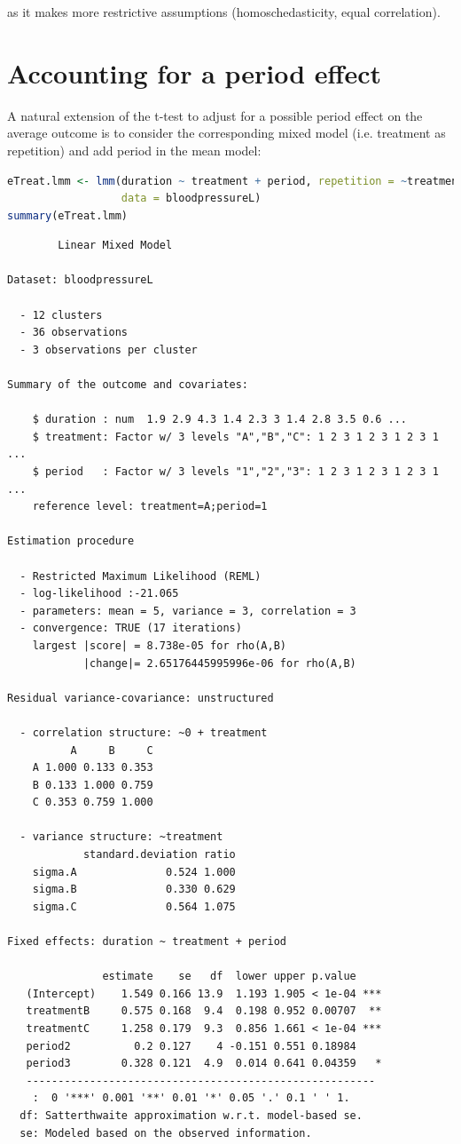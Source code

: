 \documentclass[12pt]{article}
\begin{document}
as it makes more restrictive assumptions (homoschedasticity, equal
correlation).

\clearpage
\section{Accounting for a period effect}
\label{sec:orgac4d037}

A natural extension of the t-test to adjust for a possible period
effect on the average outcome is to consider the corresponding mixed
model (i.e. treatment as repetition) and add period in the mean model:
\begin{lstlisting}[language=r,numbers=none]
eTreat.lmm <- lmm(duration ~ treatment + period, repetition = ~treatment|id,
                  data = bloodpressureL)
summary(eTreat.lmm)
\end{lstlisting}

\label{}
\begin{verbatim}
		Linear Mixed Model 
 
Dataset: bloodpressureL 

  - 12 clusters 
  - 36 observations 
  - 3 observations per cluster 

Summary of the outcome and covariates: 

    $ duration : num  1.9 2.9 4.3 1.4 2.3 3 1.4 2.8 3.5 0.6 ...
    $ treatment: Factor w/ 3 levels "A","B","C": 1 2 3 1 2 3 1 2 3 1 ...
    $ period   : Factor w/ 3 levels "1","2","3": 1 2 3 1 2 3 1 2 3 1 ...
    reference level: treatment=A;period=1 

Estimation procedure 

  - Restricted Maximum Likelihood (REML) 
  - log-likelihood :-21.065
  - parameters: mean = 5, variance = 3, correlation = 3
  - convergence: TRUE (17 iterations) 
    largest |score| = 8.738e-05 for rho(A,B)
            |change|= 2.65176445995996e-06 for rho(A,B)
 
Residual variance-covariance: unstructured 

  - correlation structure: ~0 + treatment 
          A     B     C
    A 1.000 0.133 0.353
    B 0.133 1.000 0.759
    C 0.353 0.759 1.000

  - variance structure: ~treatment 
            standard.deviation ratio
    sigma.A              0.524 1.000
    sigma.B              0.330 0.629
    sigma.C              0.564 1.075

Fixed effects: duration ~ treatment + period 

               estimate    se   df  lower upper p.value    
   (Intercept)    1.549 0.166 13.9  1.193 1.905 < 1e-04 ***
   treatmentB     0.575 0.168  9.4  0.198 0.952 0.00707  **
   treatmentC     1.258 0.179  9.3  0.856 1.661 < 1e-04 ***
   period2          0.2 0.127    4 -0.151 0.551 0.18984    
   period3        0.328 0.121  4.9  0.014 0.641 0.04359   *
   ------------------------------------------------------- 
    :  0 '***' 0.001 '**' 0.01 '*' 0.05 '.' 0.1 ' ' 1.
  df: Satterthwaite approximation w.r.t. model-based se. 
  se: Modeled based on the observed information.
\end{verbatim}
\end{document}
